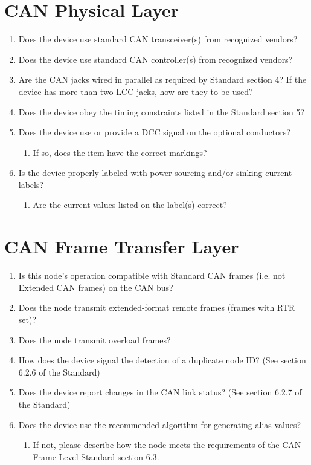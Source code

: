 \section{CAN Physical Layer}
    \begin{enumerate}
        \item Does the device use standard CAN transceiver(s) from recognized vendors?
        \item Does the device use standard CAN controller(s) from recognized vendors?
        \item Are the CAN jacks wired in parallel as required by Standard section 4?
            If the device has more than two LCC jacks, how are they to be used?
        \item Does the device obey the timing constraints listed in the Standard section 5?
        \item Does the device use or provide a DCC signal on the optional conductors?
            \begin{enumerate}
                \item If so, does the item have the correct markings?
            \end{enumerate}
        \item Is the device properly labeled with power sourcing and/or sinking current labels?
            \begin{enumerate}
                \item Are the current values listed on the label(s) correct?
            \end{enumerate}
    \end{enumerate}

\section{CAN Frame Transfer Layer}
    \begin{enumerate}
        \item Is this node's operation compatible with Standard CAN frames
            (i.e. not Extended CAN frames) on the CAN bus?
        \item Does the node transmit extended-format remote frames (frames with RTR set)?
        \item Does the node transmit overload frames?
        \item How does the device signal the detection of a duplicate node ID?
                (See section 6.2.6 of the Standard)
        \item Does the device report changes in the CAN link status? 
                (See section 6.2.7 of the Standard)
        \item Does the device use the recommended algorithm for generating alias values?
            \begin{enumerate}
                \item If not, please describe how the node meets the requirements of the 
                    CAN Frame Level Standard section 6.3.
            \end{enumerate}
    \end{enumerate}

